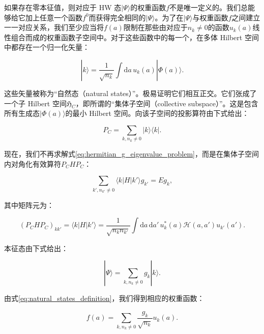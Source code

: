 如果存在零本征值，则对应于 HW 态$|\Psi\rangle$的权重函数$f$不是唯一定义的。我们总能够给它加上任意一个函数$f^{0}$而获得完全相同的$|\Psi\rangle$。为了在$|\Psi\rangle$与权重函数$f$之间建立一一对应关系，我们至少应当将$f(a)$限制在那些由对应于$n_{k}\neq0$的函数$u_{k}(a)$线性组合而成的权重函数子空间中。对于这些函数中的每一个，在多体
Hilbert 空间中都存在一个归一化矢量：

\begin{equation}
|k\rangle=\frac{1}{\sqrt{n_{k}}}\int\mathrm{d}a\,u_{k}(a)|\Phi(a)\rangle.\label{eq:natural_states_definition}
\end{equation}

这些矢量被称为``自然态（natural states）''。极易证明它们相互正交。它们张成了一个子 Hilbert 空间$\mathfrak{H}_{C}$，即所谓的``集体子空间（collective
subspace）''。这是包含所有生成态$|\Phi(a)\rangle$的最小 Hilbert 空间。向该子空间的投影算符由下式给出：

\begin{equation}
P_{C}=\sum_{k,n_{k}\neq0}|k\rangle\langle k|.\label{eq:collective_subspace_projection}
\end{equation}

现在，我们不再求解式\ref{eq:hermitian_g_eigenvalue_problem}，而是在集体子空间内对角化有效算符$P_{C}HP_{C}$：

\begin{equation}
\sum_{k',n_{k'}\neq0}\langle k|H|k'\rangle g_{k'}=Eg_{k},\label{eq:collective_hamiltonian_diagonalization}
\end{equation}

其中矩阵元为：

\begin{equation}
(P_{C}HP_{C})_{kk'}=\langle k|H|k'\rangle=\frac{1}{\sqrt{n_{k}n_{k'}}}\int\mathrm{d}a\,\mathrm{d}a'\,u^{*}_{k}(a)\mathscr{H}(a,a')u_{k'}(a').\label{eq:collective_subspace_hamiltonian_matrix}
\end{equation}

本征态由下式给出：

\begin{equation}
|\Psi\rangle=\sum_{k,n_{k}\neq0}g_{k}|k\rangle.\label{eq:eigenstate_in_natural_basis}
\end{equation}

由式\ref{eq:natural_states_definition}，我们得到相应的权重函数：

\begin{equation}
f(a)=\sum_{k,n_{k}\neq0}\frac{g_{k}}{\sqrt{n_{k}}}u_{k}(a).\label{eq:weight_function_natural_expansion}
\end{equation}


